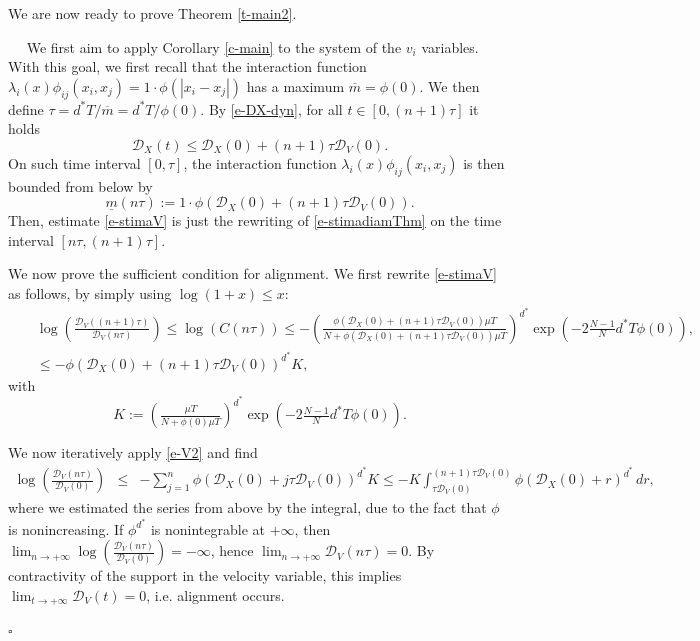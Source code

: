 \documentclass[journal]{article}
\newenvironment{proof}{{\it Proof.}~~}{\hfill$\square$}
\newcommand{\D}{\mathcal{D}}
\begin{document}
We are now ready to prove Theorem \ref{t-main2}. 

\begin{proof} We first aim to apply Corollary \ref{c-main} to the system of the $v_i$ variables. With this goal, we first recall that the interaction function $\lambda_i(x)\phi_{ij}(x_i,x_j)=1\cdot \phi(|x_i-x_j|)$ has a maximum $\overline{m}=\phi(0)$. We then define $\tau=d^* T/\overline{m}=d^* T/\phi(0)$. By \eqref{e-DX-dyn}, for all $t\in[0,(n+1)\tau]$ it holds
$$\D_X(t)\leq \D_X(0)+(n+1)\tau \D_V(0).$$
On such time interval $[0,\tau]$, the interaction function $\lambda_i(x)\phi_{ij}(x_i,x_j)$ is then bounded from below by
$$\underline{m}(n\tau):=1\cdot\phi(\D_X(0)+(n+1)\tau \D_V(0)).$$
Then, estimate \eqref{e-stimaV} is just the rewriting of \eqref{e-stimadiamThm} on the time interval $[n\tau,(n+1)\tau]$. 

We now prove the sufficient condition for alignment. We first rewrite \eqref{e-stimaV} as follows, by simply using $\log(1+x)\leq x$:
\begin{eqnarray}
&&\log\left(\frac{\D_V((n+1)\tau)}{\D_V(n\tau)}\right)\leq \log(C(n\tau))\leq - \left(\tfrac{\phi(\D_X(0)+(n+1)\tau \D_V(0))\mu T}{N+\phi(\D_X(0)+(n+1)\tau \D_V(0))\mu T}    \right)^{d^*}\exp(-2\tfrac{N-1}{N}d^*T\phi(0)),\nonumber\\
&&\leq - \phi(\D_X(0)+(n+1)\tau \D_V(0))^{d^*} K,\label{e-V2}
\end{eqnarray}
with $$K:=\left(\tfrac{\mu T}{N+\phi(0)\mu T}\right)^{d^*}\exp(-2\tfrac{N-1}{N}d^*T\phi(0)).$$

We now iteratively apply \eqref{e-V2} and find 
\begin{eqnarray*}
\log\left(\frac{\D_V(n\tau)}{\D_V(0)}\right)&\leq& -\sum_{j=1}^n \phi(\D_X(0)+j\tau \D_V(0))^{d^*} K\leq -K\int_{\tau\D_V(0)}^{(n+1)\tau\D_V(0)}\phi(\D_X(0)+r)^{d^*}\,dr,
\end{eqnarray*}where we estimated the series from above by the integral, due to the fact that $\phi$ is nonincreasing. If $\phi^{d^*}$ is nonintegrable at $+\infty$, then $\lim_{n\to+\infty}\log\left(\frac{\D_V(n\tau)}{\D_V(0)}\right)=-\infty$, hence $\lim_{n\to+\infty}\D_V(n\tau)=0$. By contractivity of the support in the velocity variable, this implies $\lim_{t\to+\infty}\D_V(t)=0$, i.e. alignment occurs.


\end{proof}
\end{document}
